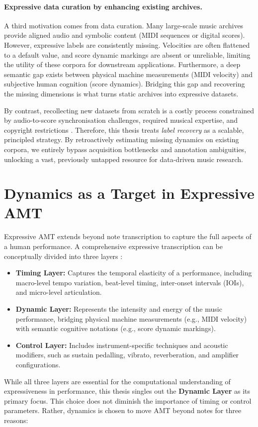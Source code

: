\paragraph{Expressive data curation by enhancing existing archives.}
A third motivation comes from data curation. Many large-scale music archives provide aligned audio and symbolic content (MIDI sequences or digital scores). However, expressive labels are consistently missing. Velocities are often flattened to a default value, and score dynamic markings are absent or unreliable, limiting the utility of these corpora for downstream applications. Furthermore, a deep semantic gap exists between physical machine measurements (MIDI velocity) and subjective human cognition (score dynamics). Bridging this gap and recovering the missing dimensions is what turns static archives into expressive datasets.

By contrast, recollecting new datasets from scratch is a costly process constrained by audio-to-score synchronisation challenges, required musical expertise, and copyright restrictions \cite{li2019urmp,foscarin2020asap,morsi2022bottlenecks}. Therefore, this thesis treats \emph{label recovery} as a scalable, principled strategy. By retroactively estimating missing dynamics on existing corpora, we entirely bypass acquisition bottlenecks and annotation ambiguities, unlocking a vast, previously untapped resource for data-driven music research.

\section{Dynamics as a Target in Expressive AMT}
\label{sec:intro:why_dynamics}

Expressive AMT extends beyond note transcription to capture the full aspects of a human performance. A comprehensive expressive transcription can be conceptually divided into three layers \cite{cancinoChacon2018computational}:
\begin{itemize}
\item \textbf{Timing Layer:} Captures the temporal elasticity of a performance, including macro-level tempo variation, beat-level timing, inter-onset intervals (IOIs), and micro-level articulation.
\item \textbf{Dynamic Layer:} Represents the intensity and energy of the music performance, bridging physical machine measurements (e.g., MIDI velocity) with semantic cognitive notations (e.g., score dynamic markings).
\item \textbf{Control Layer:} Includes instrument-specific techniques and acoustic modifiers, such as sustain pedalling, vibrato, reverberation, and amplifier configurations.
\end{itemize}
While all three layers are essential for the computational understanding of expressiveness in performance, this thesis singles out the \textbf{Dynamic Layer} as its primary focus. This choice does not diminish the importance of timing or control parameters. Rather, dynamics is chosen to move AMT beyond notes for three reasons:

